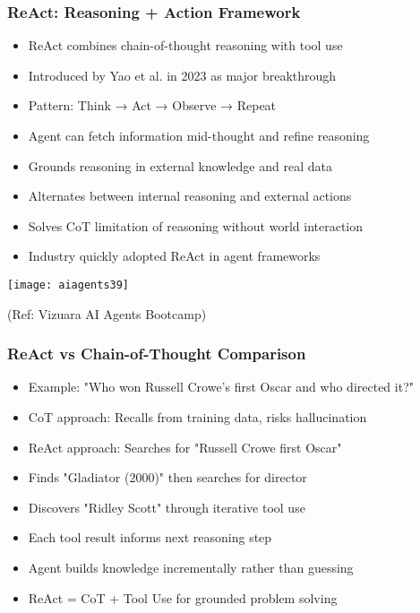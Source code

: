 \begin{frame}[fragile]\frametitle{ReAct: Reasoning + Action Framework}
      \begin{itemize}
	  \item ReAct combines chain-of-thought reasoning with tool use
	  \item Introduced by Yao et al. in 2023 as major breakthrough
	  \item Pattern: Think → Act → Observe → Repeat
	  \item Agent can fetch information mid-thought and refine reasoning
	  \item Grounds reasoning in external knowledge and real data
	  \item Alternates between internal reasoning and external actions
	  \item Solves CoT limitation of reasoning without world interaction
	  \item Industry quickly adopted ReAct in agent frameworks
	  \end{itemize}
	  
		\begin{center}
		\texttt{[image: aiagents39]}

		{\tiny (Ref: Vizuara AI Agents Bootcamp)}

		\end{center}		  
\end{frame}

\begin{frame}[fragile]\frametitle{ReAct vs Chain-of-Thought Comparison}
      \begin{itemize}
	  \item Example: "Who won Russell Crowe's first Oscar and who directed it?"
	  \item CoT approach: Recalls from training data, risks hallucination
	  \item ReAct approach: Searches for "Russell Crowe first Oscar"
	  \item Finds "Gladiator (2000)" then searches for director
	  \item Discovers "Ridley Scott" through iterative tool use
	  \item Each tool result informs next reasoning step
	  \item Agent builds knowledge incrementally rather than guessing
	  \item ReAct = CoT + Tool Use for grounded problem solving
	  \end{itemize}
\end{frame}

